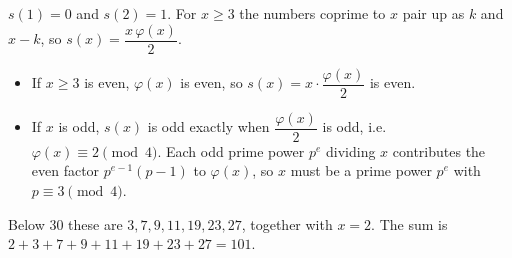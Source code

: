 $s(1)=0$ and $s(2)=1$. For $x\ge3$ the numbers coprime to $x$ pair up as $k$ and $x-k$, so $s(x)=\dfrac{x\,\varphi(x)}{2}$.
\begin{itemize}
\item If $x\ge3$ is even, $\varphi(x)$ is even, so $s(x)=x\cdot\dfrac{\varphi(x)}2$ is even.
\item If $x$ is odd, $s(x)$ is odd exactly when $\dfrac{\varphi(x)}{2}$ is odd, i.e. $\varphi(x)\equiv2\pmod4$. Each odd prime power $p^e$ dividing $x$ contributes the even factor $p^{e-1}(p-1)$ to $\varphi(x)$, so $x$ must be a prime power $p^e$ with $p\equiv3\pmod4$.
\end{itemize}
Below $30$ these are $3,7,9,11,19,23,27$, together with $x=2$. The sum is $2+3+7+9+11+19+23+27=\boxed{101}$.
